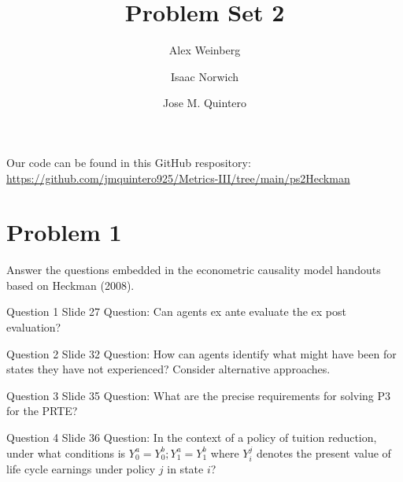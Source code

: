 \documentclass{article}
\title{Problem Set 2}
\author{Alex Weinberg \and Isaac Norwich \and Jose M. Quintero}
\begin{document}
\maketitle

Our code can be found in this GitHub respository: \url{https://github.com/jmquintero925/Metrics-III/tree/main/ps2Heckman}


\section*{Problem 1}
Answer the questions embedded in the econometric causality model handouts based on Heckman (2008).

\begin{problem}{Question 1 Slide 27}
Question: Can agents ex ante evaluate the ex post evaluation?
\end{problem}
\begin{solution}
\end{solution}


\begin{problem}{Question 2 Slide 32}
Question: How can agents identify what might have been for states they have not experienced? Consider alternative approaches.
\end{problem}
\begin{solution}
\end{solution}
 
\begin{problem}{Question 3 Slide 35}
Question: What are the precise requirements for solving P3 for the PRTE?
\end{problem}
\begin{solution}
\end{solution}
 
 
\begin{problem}{Question 4 Slide 36}
Question: In the context of a policy of tuition reduction, under what conditions is $Y^a_0 = Y^b_0; Y^a_1 = Y^b_1$ where $Y_i^j$ denotes the present value of life cycle earnings under policy $j$ in state $i$?
\end{problem}
\begin{solution}
\end{solution}
\end{document}
